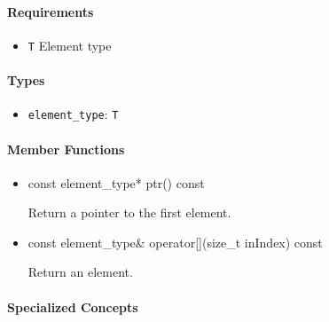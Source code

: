 \paragraph{Requirements}

\begin{itemize}
	\item \texttt{T} Element type
\end{itemize}

\paragraph{Types}

\begin{itemize}
	\item
		\texttt{element\_type}: \texttt{T}
\end{itemize}

\paragraph{Member Functions}

\begin{itemize}
	\item
		\begin{cppsnippet}
		const element_type* ptr() const
		\end{cppsnippet}

		Return a pointer to the first element.

	\item
		\begin{cppsnippet}
		const element_type& operator[](size_t inIndex) const
		\end{cppsnippet}

		Return an element.
\end{itemize}

\paragraph{Specialized Concepts}

